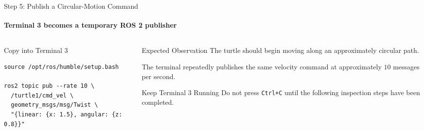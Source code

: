 \begin{frame}[fragile]{Step 5: Publish a Circular-Motion Command}
\framesubtitle{Terminal 3 becomes a temporary ROS 2 publisher}

\footnotesize

\begin{columns}[T,onlytextwidth]

    \begin{column}{0.50\textwidth}
        \begin{block}{Copy into Terminal 3}
\begin{verbatim}
source /opt/ros/humble/setup.bash

ros2 topic pub --rate 10 \
  /turtle1/cmd_vel \
  geometry_msgs/msg/Twist \
  "{linear: {x: 1.5}, angular: {z: 0.8}}"
\end{verbatim}
        \end{block}
    \end{column}

    \begin{column}{0.46\textwidth}
        \begin{exampleblock}{Expected Observation}
            The turtle should begin moving along an approximately circular path.

            The terminal repeatedly publishes the same velocity command at
            approximately \(10\) messages per second.
        \end{exampleblock}


        \vspace{0.05cm}

        \begin{alertblock}{Keep Terminal 3 Running}
            Do not press \texttt{Ctrl+C} until the following inspection steps
            have been completed.
        \end{alertblock}
    \end{column}

\end{columns}

\end{frame}

